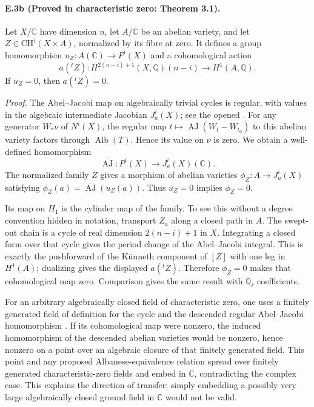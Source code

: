 \paragraph{E.3b (Proved in characteristic zero: Theorem 3.1).}
Let $X/\mathbb C$ have dimension $n$, let $A/\mathbb C$ be an
abelian variety, and let $Z\in\mathrm{CH}^i(X\times A)$, normalized
by its fibre at zero. It defines a group homomorphism
$u_Z:A(\mathbb C)\to P^i(X)$ and a cohomological action
\[
 a({}^tZ):H^{2(n-i)+1}(X,\mathbb Q)(n-i)
              \longrightarrow H^1(A,\mathbb Q).
\]
If $u_Z=0$, then $a({}^tZ)=0$.

\emph{Proof.}
The Abel--Jacobi map on algebraically trivial cycles is regular,
with values in the algebraic intermediate Jacobian
$J_a^i(X)$; see the opened
\citet[Example 1.14, Theorem 9.3]{cyACMV2022}. For any generator
$W_*\nu$ of $N^i(X)$, the regular map
$t\mapsto\operatorname{AJ}(W_t-W_{t_0})$ to this abelian variety
factors through $\operatorname{Alb}(T)$. Hence its value on $\nu$
is zero. We obtain a well-defined homomorphism
\[
 \overline{\operatorname{AJ}}:P^i(X)\longrightarrow J_a^i(X)(\mathbb C).
\]
The normalized family $Z$ gives a morphism of abelian varieties
$\phi_Z:A\to J_a^i(X)$ satisfying
$\phi_Z(a)=\overline{\operatorname{AJ}}(u_Z(a))$.
Thus $u_Z=0$ implies $\phi_Z=0$.

Its map on $H_1$ is the cylinder map of the family. To see this
without a degree convention hidden in notation, transport $Z_a$
along a closed path in $A$. The swept-out chain is a cycle of real
dimension $2(n-i)+1$ in $X$. Integrating a closed form over that
cycle gives the period change of the Abel--Jacobi integral. This is
exactly the pushforward of the K\"unneth component of $[Z]$ with
one leg in $H^1(A)$; dualizing gives the displayed
$a({}^tZ)$. Therefore $\phi_Z=0$ makes that cohomological map zero.
Comparison gives the same result with $\mathbb Q_\ell$ coefficients.

For an arbitrary algebraically closed field of characteristic zero,
one uses a finitely generated field of definition for the cycle
and the descended regular Abel--Jacobi homomorphism
\citep[Theorems 9.1 and 9.3]{cyACMV2022}. If its cohomological map
were nonzero, the induced homomorphism of the descended abelian
varieties would be nonzero, hence nonzero on a point over an
algebraic closure of that finitely generated field. This point and
any proposed Albanese-equivalence relation spread over finitely
generated characteristic-zero fields and embed in $\mathbb C$,
contradicting the complex case. This explains the direction of
transfer; simply embedding a possibly very large algebraically
closed ground field in $\mathbb C$ would not be valid.

